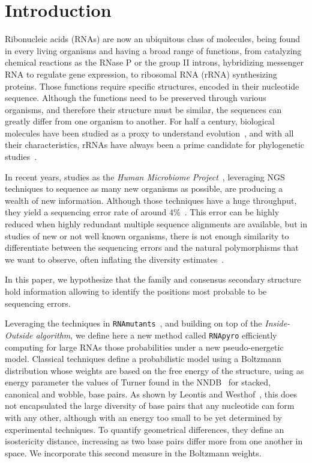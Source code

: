 \section{Introduction}
\label{sec:introduction}

Ribonucleic acids (RNAs) are  now  an ubiquitous class of molecules, being
found in every living organisms and having a broad range of functions, from catalyzing
chemical reactions as the RNase P or the group II introns,
hybridizing  messenger RNA to regulate gene expression,
to ribosomal RNA (rRNA) synthesizing proteins.
Those functions  require specific structures, 
encoded in their nucleotide sequence. Although the functions
need to be preserved through various organisms, and therefore
their structure must be similar,  the sequences
can greatly differ from one organism to another.
For half a century, biological molecules have been studied as a proxy to understand
evolution~\cite{Zuckerkandl1965}, and with all their characteristics, rRNAs have
always been a prime candidate for phylogenetic studies~\cite{Olsen1986, Olsen1993}.

In recent years, studies as the \emph{Human Microbiome Project}~\cite{Turnbaugh2007}, 
leveraging NGS techniques to sequence as many new organisms 
as possible, are producing a wealth of new information. Although
those techniques have a huge throughput, they yield a sequencing error rate of around
$4\%$~\cite{Huse2007}. This error can be highly reduced  when highly 
redundant multiple sequence alignments 
 are available, but in studies of new or not well known organisms, there is not
 enough  similarity to differentiate between the sequencing errors and the natural 
 polymorphisms that we want to observe, often inflating the diversity estimates~\cite{Kunin2010}.
 
 
In this paper, we hypothesize that the family and consensus secondary structure hold 
information allowing to identify the positions most probable to be sequencing errors.

Leveraging the techniques  in \texttt{RNAmutants}~\cite{Waldispuhl2008}, and building on top 
of the \emph{Inside-Outside algorithm}, we define here a new method called \texttt{RNApyro}
efficiently computing for large RNAs those probabilities under a new 
pseudo-energetic model.
 Classical techniques define a probabilistic model using a Boltzmann distribution 
whose weights are based on the free energy of the structure, using as energy parameter
the values of Turner found in the NNDB~\cite{Turner2010}  for stacked, 
canonical and wobble, base pairs. As shown by Leontis and Westhof~\cite{Leontis2001},
this  does not encapsulated the large diversity of base pairs that any nucleotide
can form with any other, although with an energy too small to be yet determined
by experimental techniques. To quantify geometrical differences, they
 define an isostericity distance, increasing as two base pairs differ 
 more from one another in space. We incorporate this second measure in the Boltzmann weights.
 
